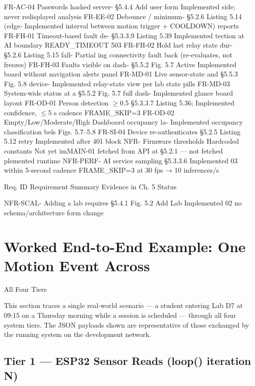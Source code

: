 FR-AC-04 Passwords hashed server- §5.4.4 Add user form Implemented
side; never redisplayed analysis
FR-EE-02 Debounce / minimum- §5.2.6 Listing 5.14 (edge- Implemented
interval between motion trigger + COOLDOWN)
reports
FR-FH-01 Timeout-based fault de- §5.3.3.9 Listing 5.39 Implemented
tection at AI boundary READY\_TIMEOUT 503
FR-FH-02 Hold last relay state dur- §5.2.6 Listing 5.15 fall- Partial
ing connectivity fault back (re-evaluates, not
freezes)
FR-FH-03 Faults visible on dash- §5.5.2 Fig. 5.7 Active Implemented
board without navigation alerts panel
FR-MD-01 Live sensor-state and §5.5.3 Fig. 5.8 device- Implemented
relay-state view per lab state pills
FR-MD-03 System-wide status at a §5.5.2 Fig. 5.7 full dash- Implemented
glance board layout
FR-OD-01 Person detection $\ge$0.5 §5.3.3.7 Listing 5.36; Implemented
conﬁdence, $\le$5 s cadence FRAME\_SKIP=3
FR-OD-02 Empty/Low/Moderate/High Dashboard occupancy la- Implemented
occupancy classiﬁcation bels Figs. 5.7--5.8
FR-SI-04 Device re-authenticates §5.2.5 Listing 5.12 retry Implemented
after 401 block
NFR- Firmware thresholds Hardcoded constants Not yet imMAIN-01 fetched from API at §5.2.1 --- not fetched plemented
runtime
NFR-PERF- AI service sampling §5.3.3.6 Implemented
03 within 5-second cadence FRAME\_SKIP=3 at
30 fps → 10 inferences/s







Req. ID Requirement Summary Evidence in Ch. 5 Status

NFR-SCAL- Adding a lab requires §5.4.1 Fig. 5.2 Add Lab Implemented
02 no schema/architecture form
change




\section{Worked End-to-End Example: One Motion Event Across}

All Four Tiers

This section traces a single real-world scenario --- a student entering Lab D7 at 09:15 on
a Thursday morning while a session is scheduled --- through all four system tiers. The
JSON payloads shown are representative of those exchanged by the running system on the
development network.




\subsection{Tier 1 --- ESP32 Sensor Reads (loop() iteration N)}


